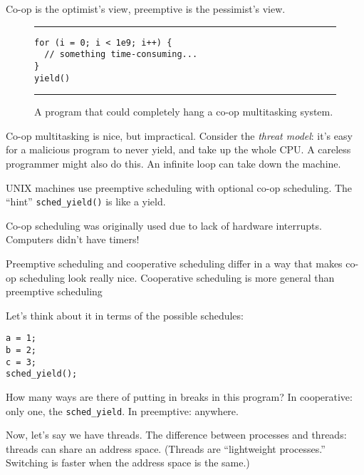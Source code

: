 \documentclass[twoside]{article}
\begin{document}
Co-op is the optimist's view, preemptive is the pessimist's view.

\begin{figure}[h]
\rule{\textwidth}{1pt}
\begin{verbatim}
for (i = 0; i < 1e9; i++) {
  // something time-consuming...
}
yield()
\end{verbatim}
\rule{\textwidth}{1pt}
\caption{A program that could completely hang a co-op multitasking system.}
\end{figure}

Co-op multitasking is nice, but impractical. Consider the \textit{threat model}: it's easy for a malicious program to never yield, and take up the whole CPU. A careless programmer might also do this. An infinite loop can take down the machine.

UNIX machines use preemptive scheduling with optional co-op scheduling. The ``hint'' \texttt{sched\_yield()} is like a yield.

Co-op scheduling was originally used due to lack of hardware interrupts. Computers didn't have timers!

Preemptive scheduling and cooperative scheduling differ in a way that makes co-op scheduling look really nice. Cooperative scheduling is more general than preemptive scheduling

Let's think about it in terms of the possible schedules:

\begin{verbatim}
a = 1;
b = 2;
c = 3;
sched_yield();
\end{verbatim}

How many ways are there of putting in breaks in this program? \newline
In cooperative: only one, the \texttt{sched\_yield}. \newline
In preemptive: anywhere.

Now, let's say we have threads. The difference between processes and threads: threads can share an address space. (Threads are ``lightweight processes.'' Switching is faster when the address space is the same.)
\end{document}
